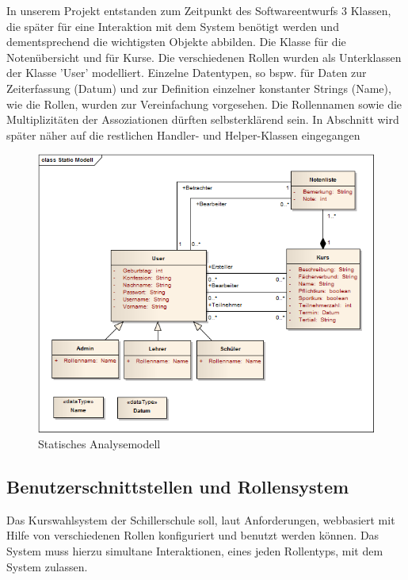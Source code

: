 In unserem Projekt entstanden zum Zeitpunkt des Softwareentwurfs 3 Klassen, die später für eine Interaktion mit dem System benötigt werden und dementsprechend die wichtigsten Objekte abbilden. Die Klasse für die Notenübersicht und für Kurse. Die verschiedenen Rollen wurden als Unterklassen der Klasse 'User' modelliert. Einzelne Datentypen, so bspw. für Daten zur Zeiterfassung (Datum) und zur Definition einzelner konstanter Strings (Name), wie die Rollen, wurden zur Vereinfachung vorgesehen.
Die Rollennamen sowie die Multiplizitäten der Assoziationen dürften selbsterklärend sein.
In Abschnitt  wird später näher auf die restlichen Handler- und Helper-Klassen eingegangen

\begin{figure}[H]
 \begin{center}
   \includegraphics[scale=0.7]{img/StaticClassModel_kuwasys20.png}
 \end{center}
 \caption[\textbf{Statisches Analysemodell}]{Statisches Analysemodell}
 \label{fig:UML_SA_kuwasys20}
\end{figure}

\subsection{Benutzerschnittstellen und Rollensystem}\label{subsec:Benutzerschnittstellen und Rollensystem}

Das Kurswahlsystem der Schillerschule soll, laut Anforderungen, webbasiert mit Hilfe von verschiedenen Rollen konfiguriert und benutzt werden können.
Das System muss hierzu simultane Interaktionen, eines jeden Rollentyps, mit dem System zulassen. 


